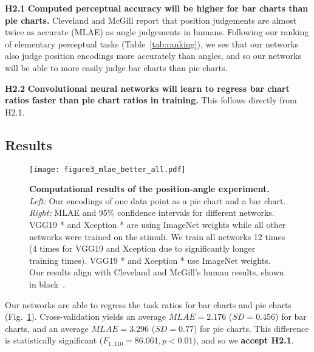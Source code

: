 \begin{hypolist}
	\item \textbf{H2.1} \textbf{Computed perceptual accuracy will be higher for bar charts than pie charts.} Cleveland and McGill report that position judgements are almost twice as accurate (MLAE) as angle judgements in humans. Following our ranking of elementary perceptual tasks (Table~\ref{tab:ranking}), we see that our networks also judge position encodings more accurately than angles, and so our networks will be able to more easily judge bar charts than pie charts.
	\item \textbf{H2.2} \textbf{Convolutional neural networks will learn to regress bar chart ratios faster than pie chart ratios in training.} This follows directly from H2.1.
\end{hypolist}

\subsection{Results}

\begin{figure}[t]
	\centering
	  \texttt{[image: figure3\_mlae\_better\_all.pdf]}
  \caption{\textbf{Computational results of the position-angle experiment.} \textit{Left:} Our encodings of one data point as a pie chart and a bar chart. \textit{Right:} MLAE and 95\% confidence intervals for different networks. VGG19 * and Xception * are using ImageNet weights while all other networks were trained on the stimuli. We train all networks 12 times (4 times for VGG19 and Xception due to significantly longer training times). VGG19 * and Xception * use ImageNet weights. Our results align with Cleveland and McGill's human results, shown in black~\cite{cleveland_mcgill}.}
	\label{fig:figure3_mlae}
\end{figure}


 Our networks are able to regress the task ratios for bar charts and pie charts (Fig.~\ref{fig:figure3_mlae}).  Cross-validation yields an average $MLAE=2.176$ ($SD=0.456$) for bar charts, and an average $MLAE=3.296$ ($SD=0.77$) for pie charts. This difference is statistically significant ($F_{1,110}=86.061, p<0.01$), and so we \textbf{accept H2.1}. 


